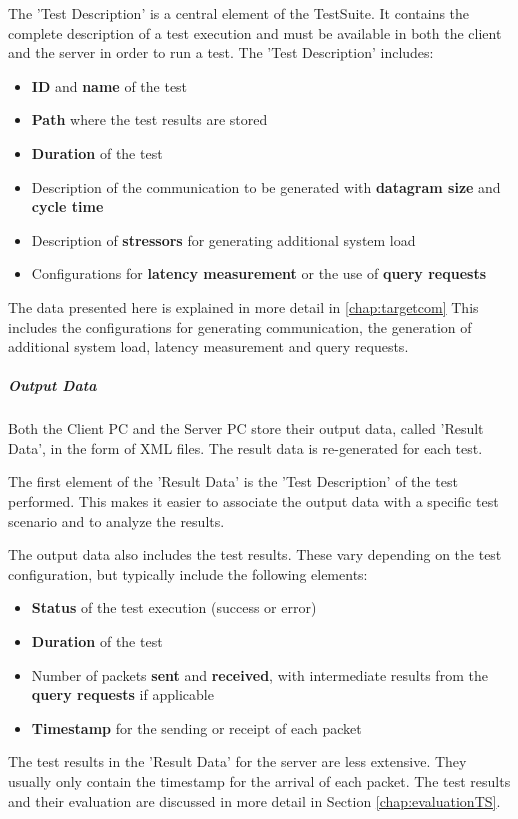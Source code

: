 The 'Test Description' is a central element of the TestSuite. It contains the complete description of a test execution and must be available in both the client and the server in order to run a test. The 'Test Description' includes:
\begin{itemize}
	\item \textbf{ID} and \textbf{name} of the test
	\item \textbf{Path} where the test results are stored
	\item \textbf{Duration} of the test
	\item Description of the communication to be generated with \textbf{datagram size} and \textbf{cycle time}
	\item Description of \textbf{stressors} for generating additional system load
	\item Configurations for \textbf{latency measurement} or the use of \textbf{query requests}
\end{itemize}

The data presented here is explained in more detail in \ref{chap:targetcom} This includes the configurations for generating communication, the generation of additional system load, latency measurement and query requests.

\subparagraph{Output Data}

Both the Client PC and the Server PC store their output data, called 'Result Data', in the form of XML files. The result data is re-generated for each test.

The first element of the 'Result Data' is the 'Test Description' of the test performed. This makes it easier to associate the output data with a specific test scenario and to analyze the results.

The output data also includes the test results. These vary depending on the test configuration, but typically include the following elements:
\begin{itemize}
	\item \textbf{Status} of the test execution (success or error)
	\item \textbf{Duration} of the test
	\item Number of packets \textbf{sent} and \textbf{received}, with intermediate results from the \textbf{query requests} if applicable
	\item \textbf{Timestamp} for the sending or receipt of each packet
\end{itemize}

The test results in the 'Result Data' for the server are less extensive. They usually only contain the timestamp for the arrival of each packet. The test results and their evaluation are discussed in more detail in Section \ref{chap:evaluationTS}.

